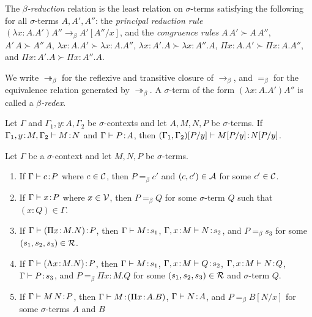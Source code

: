 \documentclass[reqno, twoside]{article}
\begin{document}
    \begin{definition}
        The \textit{$\beta$-reduction} relation is the least relation on $\sigma$-terms satisfying the following for all $\sigma$-terms $A,A',A''$: the \textit{principal reduction rule} $(\lambda x\!:\!A.A')A''\rightarrow_\beta A'[A''/x]$, and the \textit{congruence rules} $A\,A'\succ A\,A''$, $A'\,A\succ A''\,A$, $\lambda x\!:\!A.A'\succ\lambda x\!:\!A.A''$, $\lambda x\!:\!A'.A\succ\lambda x\!:\!A''.A$, $\Pi x\!:\!A.A'\succ\Pi x\!:\!A.A''$, and $\Pi x\!:\!A'.A\succ\Pi x\!:\!A''.A$.
    \end{definition}

    \begin{notation}
        We write $\twoheadrightarrow_\beta$ for the reflexive and transitive closure of $\rightarrow_\beta$, and $=_\beta$ for the equivalence relation generated by $\twoheadrightarrow_\beta$. A $\sigma$-term of the form $(\lambda x\!:\!A.A')A''$ is called a \textit{$\beta$-redex}.
    \end{notation}

    \begin{lemma}\label{lem:substitution}
        Let $\Gamma$ and $\Gamma_1,y\!:\!A,\Gamma_2$ be $\sigma$-contexts and let $A,M,N,P$ be $\sigma$-terms. If $\Gamma_1,y\!:\!M,\Gamma_2\vdash M\!:\!N$ and $\Gamma\vdash P\!:\!A$, then $(\Gamma_1,\Gamma_2)[P/y]\vdash M[P/y]\!:\!N[P/y]$.
    \end{lemma}

    \begin{lemma}\label{lem:stripping}
        Let $\Gamma$ be a $\sigma$-context and let $M,N,P$ be $\sigma$-terms.
        \begin{enumerate}
            \item If $\Gamma\vdash c\!:\!P$ where $c\in\mathcal{C}$, then $P=_\beta c'$ and $(c,c')\in\mathcal{A}$ for some $c'\in\mathcal{C}$.
                \vspace{-0.05in}
            \item If $\Gamma\vdash x\!:\!P$ where $x\in\mathcal{V}$, then $P=_\beta Q$ for some $\sigma$-term $Q$ such that $(x\!:\!Q)\in\Gamma$.
                \vspace{-0.05in}
            \item If $\Gamma\vdash(\Pi x\!:\!M.N)\!:\!P$, then $\Gamma\vdash M\!:\!s_1$, $\Gamma,x\!:\!M\vdash N\!:\!s_2$, and $P=_\beta s_3$ for some $(s_1,s_2,s_3)\in\mathcal{R}$.
                \vspace{-0.05in}
            \item If $\Gamma\vdash(\Lambda x\!:\!M.N)\!:\!P$, then $\Gamma\vdash M\!:\!s_1$, $\Gamma,x\!:\!M\vdash Q\!:\!s_2$, $\Gamma,x\!:\!M\vdash N\!:\!Q$, $\Gamma\vdash P\!:\!s_3$, and $P=_\beta\Pi x\!:\! M.Q$ for some $(s_1,s_2,s_3)\in\mathcal{R}$ and $\sigma$-term $Q$.
                \vspace{-0.05in}
            \item If $\Gamma\vdash M\,N\!:\!P$, then $\Gamma\vdash M\!:\!(\Pi x\!:\!A.B)$, $\Gamma\vdash N\!:\!A$, and $P=_\beta B[N/x]$ for some $\sigma$-terms $A$ and $B$
        \end{enumerate}
    \end{lemma}
\end{document}
